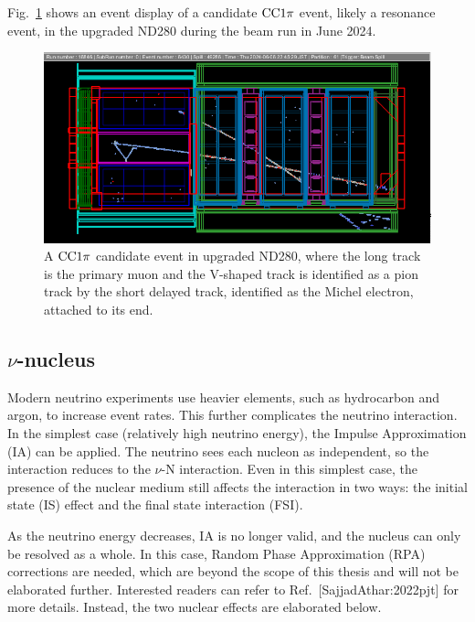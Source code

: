 Fig.~\ref{fig:cc1pi} shows an event display of a candidate $\textrm{CC}1\pi$ event, likely a resonance event, in the upgraded ND280 during the beam run in June 2024.

\begin{figure}[!htb] 	
    \centering 		
    \includegraphics[width=\sgfigwid\textwidth]{figures/shortME.png}
    \caption{\label{fig:cc1pi} A $\textrm{CC}1\pi$ candidate event in upgraded ND280, where the long track is the primary muon and the V-shaped track is identified as a pion track by the short delayed track, identified as the Michel electron, attached to its end.} 
\end{figure}

\subsection{$\nu$-nucleus}
Modern neutrino experiments use heavier elements, such as hydrocarbon and argon, to increase event rates.
This further complicates the neutrino interaction.
In the simplest case (relatively high neutrino energy), the Impulse Approximation (IA) can be applied.
The neutrino sees each nucleon as independent, so the interaction reduces to the $\nu$-N interaction.
Even in this simplest case, the presence of the nuclear medium still affects the interaction in two ways: the initial state (IS) effect and the final state interaction (FSI).

As the neutrino energy decreases, IA is no longer valid, and the nucleus can only be resolved as a whole.
In this case, Random Phase Approximation (RPA) corrections are needed, which are beyond the scope of this thesis and will not be elaborated further. 
Interested readers can refer to Ref.~[SajjadAthar:2022pjt] for more details.
Instead, the two nuclear effects are elaborated below.

